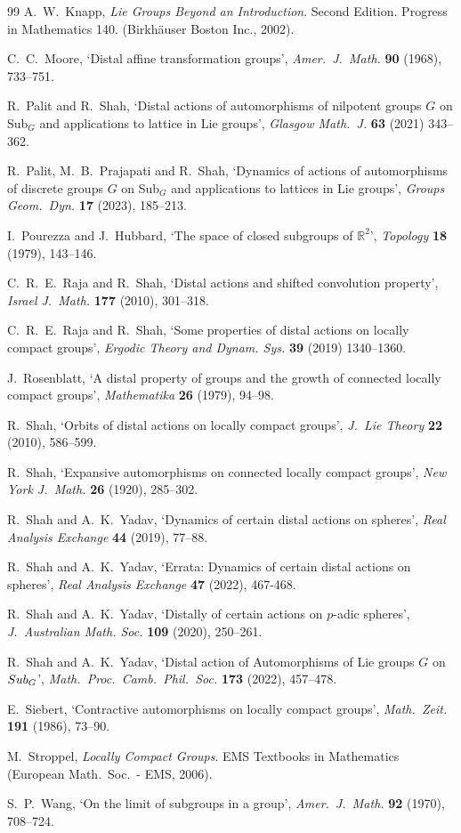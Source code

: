 \documentclass{amsart}
\numberwithin{equation}{section}
\newcommand{\Sub}{{\rm Sub}}
\newcommand{\R}{{\mathbb R}}
\theoremstyle{remark}
\begin{document}
\begin{thebibliography}{99}
 A.\ W.\ Knapp, {\em Lie Groups Beyond an Introduction}. Second Edition. Progress in Mathematics 140. 
(Birkh\"auser Boston Inc., 2002).  

 C.\ C.\ Moore, `Distal affine transformation groups', {\em Amer.\ J.\ Math.} {\bf 90} (1968), 733--751.

 R.\ Palit and R.\ Shah, `Distal actions of automorphisms of nilpotent groups $G$ on Sub$_G$ and 
applications to lattice in Lie groups', {\em Glasgow Math.\ J.} {\bf 63} (2021) 343--362.

 R.\ Palit, M.\ B.\ Prajapati and R.\ Shah, `Dynamics of actions of automorphisms of discrete
groups $G$ on Sub$_G$ and applications to lattices in Lie groups', {\em Groups Geom.\ Dyn.} {\bf 17} (2023), 185--213.

 I.\ Pourezza and J.\ Hubbard, `The space of closed subgroups of $\R^2$', {\em Topology} {\bf 18} (1979), 143--146.

 C.\ R.\ E.\ Raja and R.\ Shah, `Distal actions and shifted convolution property', 
{\em Israel J.\ Math.} {\bf 177} (2010), 301--318.

 C.\ R.\ E.\ Raja and R.\ Shah, `Some properties of distal actions on locally compact
groups', {\em Ergodic Theory and Dynam. Sys.} {\bf 39} (2019) 1340--1360.

 J.\ Rosenblatt, `A distal property of groups and the growth of connected locally compact groups', 
{\em Mathematika} {\bf 26} (1979), 94--98.

 R.\ Shah, `Orbits of distal actions on locally compact groups', {\em J.\ Lie Theory} {\bf 22} (2010), 586--599.

 R.\ Shah, `Expansive automorphisms on connected locally compact groups', {\em New York J.\ Math.} 
{\bf 26} (1920), 285--302.

 R.\ Shah and A.\ K.\ Yadav, `Dynamics of certain distal actions on spheres',
{\em Real Analysis Exchange} {\bf 44} (2019), 77--88.

 R.\ Shah and A.\ K.\ Yadav, `Errata: Dynamics of certain distal actions on spheres', 
{\em Real Analysis Exchange} {\bf 47} (2022), 467-468.

 R.\ Shah and A.\ K.\ Yadav, `Distally of certain actions on $p$-adic spheres', {\em J.\ 
Australian Math. Soc.} {\bf 109} (2020), 250--261.

 R.\ Shah and A.\ K.\ Yadav, `Distal action of Automorphisms of Lie groups $G$ on $\Sub_G$', 
{\em Math.\ Proc.\ Camb.\ Phil.\ Soc.} {\bf 173} (2022), 457--478.

 E.\ Siebert, `Contractive automorphisms on locally compact groups', {\em Math.\ Zeit.} {\bf 191} (1986), 
73--90.

 M.\ Stroppel, {\em Locally Compact Groups}. EMS Textbooks in Mathematics (European Math.\ 
Soc.\ - EMS, 2006).

 S.\ P.\ Wang, `On the limit of subgroups in a group', {\em Amer.\ J.\ Math.} {\bf 92} (1970),
708--724.

\end{thebibliography}
 
\end{document}
